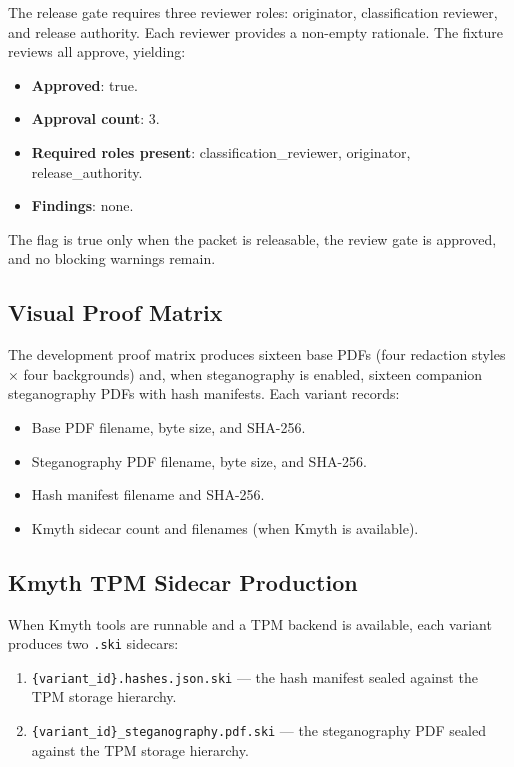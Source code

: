 \documentclass[
]{article}
\newcounter{none} %
\providecommand{\tightlist}{%
  \setlength{\itemsep}{0pt}\setlength{\parskip}{0pt}}
\begin{document}
The release gate requires three reviewer roles: originator,
classification reviewer, and release authority. Each reviewer provides a
non-empty rationale. The fixture reviews all approve, yielding:

\begin{itemize}
\tightlist
\item
  \textbf{Approved}: true.
\item
  \textbf{Approval count}: 3.
\item
  \textbf{Required roles present}: classification\_reviewer, originator,
  release\_authority.
\item
  \textbf{Findings}: none.
\end{itemize}

The  flag is true only when the
packet is releasable, the review gate is approved, and no blocking
warnings remain.

\subsection{Visual Proof Matrix}\label{visual-proof-matrix}

The development proof matrix produces sixteen base PDFs (four redaction
styles \texorpdfstring{\ensuremath{\times}}{x} four backgrounds) and, when steganography is enabled, sixteen
companion steganography PDFs with hash manifests. Each variant records:

\begin{itemize}
\tightlist
\item
  Base PDF filename, byte size, and SHA-256.
\item
  Steganography PDF filename, byte size, and SHA-256.
\item
  Hash manifest filename and SHA-256.
\item
  Kmyth sidecar count and filenames (when Kmyth is available).
\end{itemize}

\subsection{Kmyth TPM Sidecar
Production}\label{kmyth-tpm-sidecar-production}

When Kmyth tools are runnable and a TPM backend is available, each
variant produces two \texttt{.ski} sidecars:

\begin{enumerate}
\def\labelenumi{\arabic{enumi}.}
\tightlist
\item
  \texttt{\{variant\_id\}.hashes.json.ski} --- the hash manifest sealed
  against the TPM storage hierarchy.
\item
  \texttt{\{variant\_id\}\_steganography.pdf.ski} --- the steganography
  PDF sealed against the TPM storage hierarchy.
\end{enumerate}
\end{document}
